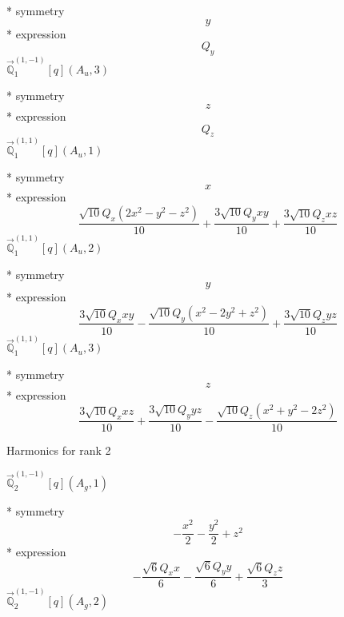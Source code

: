 \documentclass[fleqn,8pt]{jsarticle}
\begin{document}
\noindent\quad ** symmetry
\begin{dmath*}
y
\end{dmath*}
\noindent\quad ** expression
\begin{dmath*}
Q_{y}
\end{dmath*}
\noindent\quad $\vec{\mathbb{Q}}_{1}^{(1,-1)}[q](A_{u},3)$

\noindent\quad ** symmetry
\begin{dmath*}
z
\end{dmath*}
\noindent\quad ** expression
\begin{dmath*}
Q_{z}
\end{dmath*}
\noindent\quad $\vec{\mathbb{Q}}_{1}^{(1,1)}[q](A_{u},1)$

\noindent\quad ** symmetry
\begin{dmath*}
x
\end{dmath*}
\noindent\quad ** expression
\begin{dmath*}
\frac{\sqrt{10} Q_{x} \left(2 x^{2} - y^{2} - z^{2}\right)}{10} + \frac{3 \sqrt{10} Q_{y} x y}{10} + \frac{3 \sqrt{10} Q_{z} x z}{10}
\end{dmath*}
\noindent\quad $\vec{\mathbb{Q}}_{1}^{(1,1)}[q](A_{u},2)$

\noindent\quad ** symmetry
\begin{dmath*}
y
\end{dmath*}
\noindent\quad ** expression
\begin{dmath*}
\frac{3 \sqrt{10} Q_{x} x y}{10} - \frac{\sqrt{10} Q_{y} \left(x^{2} - 2 y^{2} + z^{2}\right)}{10} + \frac{3 \sqrt{10} Q_{z} y z}{10}
\end{dmath*}
\noindent\quad $\vec{\mathbb{Q}}_{1}^{(1,1)}[q](A_{u},3)$

\noindent\quad ** symmetry
\begin{dmath*}
z
\end{dmath*}
\noindent\quad ** expression
\begin{dmath*}
\frac{3 \sqrt{10} Q_{x} x z}{10} + \frac{3 \sqrt{10} Q_{y} y z}{10} - \frac{\sqrt{10} Q_{z} \left(x^{2} + y^{2} - 2 z^{2}\right)}{10}
\end{dmath*}

\noindent * Harmonics for rank 2

\noindent\quad $\vec{\mathbb{Q}}_{2}^{(1,-1)}[q](A_{g},1)$

\noindent\quad ** symmetry
\begin{dmath*}
- \frac{x^{2}}{2} - \frac{y^{2}}{2} + z^{2}
\end{dmath*}
\noindent\quad ** expression
\begin{dmath*}
- \frac{\sqrt{6} Q_{x} x}{6} - \frac{\sqrt{6} Q_{y} y}{6} + \frac{\sqrt{6} Q_{z} z}{3}
\end{dmath*}
\noindent\quad $\vec{\mathbb{Q}}_{2}^{(1,-1)}[q](A_{g},2)$
\end{document}
